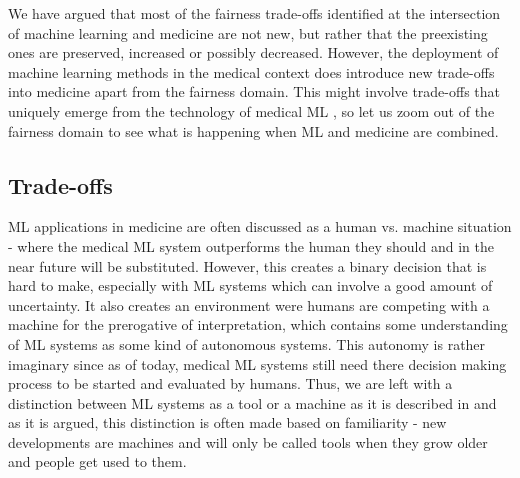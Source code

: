 
We have argued that most of the fairness trade-offs identified at the intersection of machine learning and medicine are not new, but rather that the preexisting ones are preserved, increased or possibly decreased. However, the deployment of machine learning methods in the medical context does introduce new trade-offs into medicine apart from the fairness domain. This might involve trade-offs that uniquely emerge from the technology of medical ML \cite{Dijkstra2020}, so let us zoom out of the fairness domain to see what is happening when ML and medicine are combined. 


\subsection{Trade-offs}

ML applications in medicine are often discussed as a human vs. machine situation - where the medical ML system outperforms the human they should and in the near future will be substituted. However, this creates a binary decision that is hard to make, especially with ML systems which can involve a good amount of uncertainty. It also creates an environment were humans are competing with a machine for the prerogative of interpretation, which contains some understanding of ML systems as some kind of autonomous systems. This autonomy is rather imaginary since as of today, medical ML systems still need there decision making process to be started and evaluated by humans. Thus, we are left with a distinction between ML systems as a tool or a machine as it is described in \cite{Williamson2021} and as it is argued, this distinction is often made based on familiarity - new developments are machines and will only be called tools when they grow older and people get used to them. 

